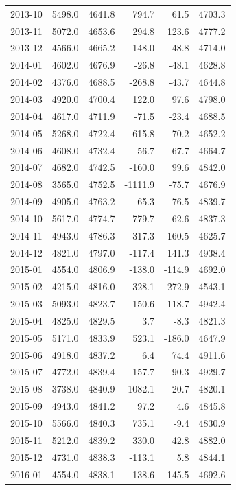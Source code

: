 \begin{longtable}{lrrrrr}
2013-10 & 5498.0 & 4641.8 & 794.7 & 61.5 & 4703.3 \\ 
2013-11 & 5072.0 & 4653.6 & 294.8 & 123.6 & 4777.2 \\ 
2013-12 & 4566.0 & 4665.2 & -148.0 & 48.8 & 4714.0 \\ 
2014-01 & 4602.0 & 4676.9 & -26.8 & -48.1 & 4628.8 \\ 
2014-02 & 4376.0 & 4688.5 & -268.8 & -43.7 & 4644.8 \\ 
2014-03 & 4920.0 & 4700.4 & 122.0 & 97.6 & 4798.0 \\ 
2014-04 & 4617.0 & 4711.9 & -71.5 & -23.4 & 4688.5 \\ 
2014-05 & 5268.0 & 4722.4 & 615.8 & -70.2 & 4652.2 \\ 
2014-06 & 4608.0 & 4732.4 & -56.7 & -67.7 & 4664.7 \\ 
2014-07 & 4682.0 & 4742.5 & -160.0 & 99.6 & 4842.0 \\ 
2014-08 & 3565.0 & 4752.5 & -1111.9 & -75.7 & 4676.9 \\ 
2014-09 & 4905.0 & 4763.2 & 65.3 & 76.5 & 4839.7 \\ 
2014-10 & 5617.0 & 4774.7 & 779.7 & 62.6 & 4837.3 \\ 
2014-11 & 4943.0 & 4786.3 & 317.3 & -160.5 & 4625.7 \\ 
2014-12 & 4821.0 & 4797.0 & -117.4 & 141.3 & 4938.4 \\ 
2015-01 & 4554.0 & 4806.9 & -138.0 & -114.9 & 4692.0 \\ 
2015-02 & 4215.0 & 4816.0 & -328.1 & -272.9 & 4543.1 \\ 
2015-03 & 5093.0 & 4823.7 & 150.6 & 118.7 & 4942.4 \\ 
2015-04 & 4825.0 & 4829.5 & 3.7 & -8.3 & 4821.3 \\ 
2015-05 & 5171.0 & 4833.9 & 523.1 & -186.0 & 4647.9 \\ 
2015-06 & 4918.0 & 4837.2 & 6.4 & 74.4 & 4911.6 \\ 
2015-07 & 4772.0 & 4839.4 & -157.7 & 90.3 & 4929.7 \\ 
2015-08 & 3738.0 & 4840.9 & -1082.1 & -20.7 & 4820.1 \\ 
2015-09 & 4943.0 & 4841.2 & 97.2 & 4.6 & 4845.8 \\ 
2015-10 & 5566.0 & 4840.3 & 735.1 & -9.4 & 4830.9 \\ 
2015-11 & 5212.0 & 4839.2 & 330.0 & 42.8 & 4882.0 \\ 
2015-12 & 4731.0 & 4838.3 & -113.1 & 5.8 & 4844.1 \\ 
2016-01 & 4554.0 & 4838.1 & -138.6 & -145.5 & 4692.6 \\ 

\end{longtable}
